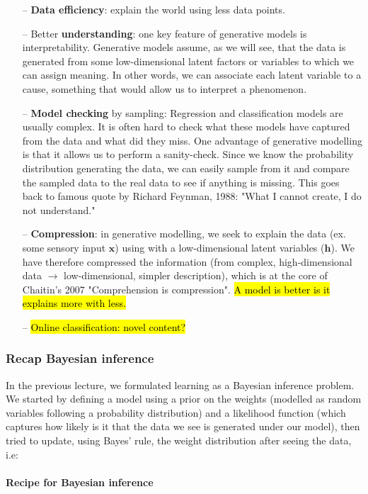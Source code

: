 \documentclass[main]{subfiles}
\begin{document}
\begin{itemize}
    \item [--] \textbf{Data efficiency}: explain the world using less data points. 
    \item [--] Better \textbf{understanding}: one key feature of generative models is interpretability. Generative models assume, as we will see, that the data is generated from some low-dimensional latent factors or variables to which we can assign meaning. In other words, we can associate each latent variable to a cause, something that would allow us to interpret a phenomenon.
    \item [--] \textbf{Model checking} by sampling: Regression and classification models are usually complex. It is often hard to check what these models have captured from the data and what did they miss. One advantage of generative modelling is that it allows us to perform a sanity-check. Since we know the probability distribution generating the data, we can easily sample from it and compare the sampled data to the real data to see if anything is missing. This goes back to famous quote by Richard Feynman, 1988: "What I cannot create, I do not understand."
    \item [--] \textbf{Compression}:
    in generative modelling, we seek to explain the data (ex. some sensory input $\bm{x}$) using with a low-dimensional latent variables ($\bm{h}$). We have therefore compressed the information (from complex, high-dimensional data $\rightarrow$ low-dimensional, simpler description), which is at the core of Chaitin's 2007 "Comprehension is compression". \hl{A model is better is it explains more with less.}
    \item [--] \hl{Online classification: novel content?}
\end{itemize}

\subsubsection{Recap Bayesian inference}
In the previous lecture, we formulated learning as a Bayesian inference problem. We started by defining a model using a prior on the weights (modelled as random variables following a probability distribution) and a likelihood function (which captures how likely is it that the data we see is generated under our model), then tried to update, using Bayes' rule, the weight distribution after seeing the data, i.e:

\paragraph{Recipe for Bayesian inference}\mbox{}\\
\end{document}
